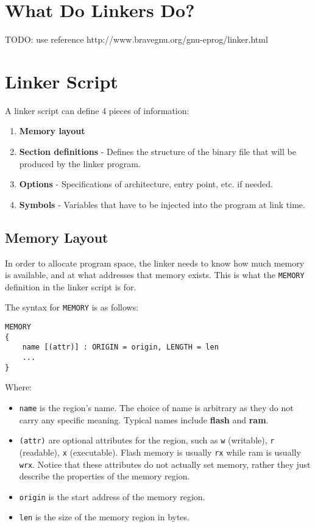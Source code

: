 \section{What Do Linkers Do?}
TODO: use reference http://www.bravegnu.org/gnu-eprog/linker.html

\section{Linker Script}
A linker script can define 4 pieces of information:
\begin{enumerate}
    \item \textbf{Memory layout}
    \item \textbf{Section definitions} - Defines the structure of the binary file that will be produced by the linker program.
    \item \textbf{Options} - Specifications of architecture, entry point, etc. if needed.
    \item \textbf{Symbols} - Variables that have to be injected into the program at link time.
\end{enumerate}\cite{memfaultLinkerScripts}

\subsection{Memory Layout}
In order to allocate program space, the linker needs to know how much memory is available, and at what addresses that memory exists. This is what the \verb|MEMORY| definition in the linker script is for.

The syntax for \verb|MEMORY| is as follows:
\begin{verbatim}
MEMORY
{
    name [(attr)] : ORIGIN = origin, LENGTH = len
    ...
}
\end{verbatim}
Where:
\begin{itemize}
    \item \verb|name| is the region's name. The choice of name is arbitrary as they do not carry any specific meaning. Typical names include \textbf{flash} and \textbf{ram}.
    \item \verb|(attr)| are optional attributes for the region, such as \verb|w| (writable), \verb|r| (readable), \verb|x| (executable). Flash memory is usually \verb|rx| while ram is usually \verb|wrx|. Notice that these attributes do not actually set memory, rather they just describe the properties of the memory region.
    \item \verb|origin| is the start address of the memory region.
    \item \verb|len| is the size of the memory region in bytes.
\end{itemize}

